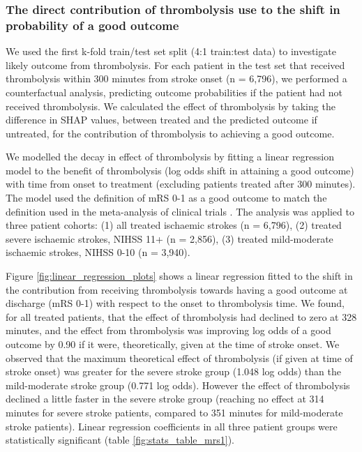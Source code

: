 

\subsubsection{The direct contribution of thrombolysis use to the shift in probability of a good outcome}

We used the first k-fold train/test set split (4:1 train:test data) to investigate likely outcome from thrombolysis. For each patient in the test set that received thrombolysis within 300 minutes from stroke onset (n = 6,796), we performed a counterfactual analysis, predicting outcome probabilities if the patient had not received thrombolysis. We calculated the effect of thrombolysis by taking the difference in SHAP values, between treated and the predicted outcome if untreated, for the contribution of thrombolysis to achieving a good outcome.

We modelled the decay in effect of thrombolysis by fitting a linear regression model to the benefit of thrombolysis (log odds shift in attaining a good outcome) with time from onset to treatment (excluding patients treated after 300 minutes). The model used the definition of mRS 0-1 as a good outcome to match the definition used in the meta-analysis of clinical trials \cite{emberson_effect_2014}. The analysis was applied to three patient cohorts: (1) all treated ischaemic strokes (n = 6,796), (2) treated severe ischaemic strokes, NIHSS 11+ (n = 2,856), (3) treated mild-moderate ischaemic strokes, NIHSS 0-10 (n = 3,940). 

Figure \ref{fig:linear_regression_plots} shows a linear regression fitted to the shift in the contribution from receiving thrombolysis towards having a good outcome at discharge (mRS 0-1) with respect to the onset to thrombolysis time. We found, for all treated patients, that the effect of thrombolysis had declined to zero at 328 minutes, and the effect from thrombolysis was improving log odds of a good outcome by 0.90 if it were, theoretically, given at the time of stroke onset. We observed that the maximum theoretical effect of thrombolysis (if given at time of stroke onset) was greater for the severe stroke group (1.048 log odds) than the mild-moderate stroke group (0.771 log odds). However the effect of thrombolysis declined a little faster in the severe stroke group (reaching no effect at 314 minutes for severe stroke patients, compared to 351 minutes for mild-moderate stroke patients). Linear regression coefficients in all three patient groups were statistically significant (table \ref{fig:stats_table_mrs1}). 

